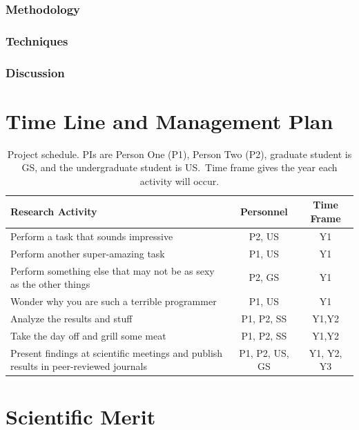 \subsubsection{Methodology}
\subsubsection{Techniques}
\subsubsection{Discussion}

\section{Time Line and Management Plan}

\begin{table}[H]
\label{table1}
\renewcommand{\arraystretch}{0}
\caption{Project schedule.  PIs are Person One (P1), Person Two (P2), graduate student is GS, and the undergraduate student is US.\ Time frame gives the year each activity will occur.}
\scriptsize
\begin{tabularx}{\textwidth}{Y c c }
\hline
\hline
\textbf{Research Activity} & \textbf{Personnel} & \textbf{Time Frame}\\
\hline
Perform a task that sounds impressive & P2, US & Y1 \T\\
Perform another super-amazing task & P1, US & Y1 \T\\
Perform something else that may not be as sexy as the other things & P2, GS & Y1 \T\\
Wonder why you are such a terrible programmer & P1, US & Y1 \T\\
Analyze the results and stuff & P1, P2, SS & Y1,Y2 \T\\
Take the day off and grill some meat & P1, P2, SS & Y1,Y2 \T\\
Present findings at scientific meetings and publish results in peer-reviewed journals & P1, P2, US, GS & Y1, Y2, Y3\T\B\\
\hline
\hline
\end{tabularx}
\end{table}

\section{Scientific Merit}

